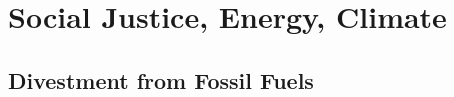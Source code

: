 \chapter{Social Justice, Energy, Climate}\label{ch:climate_justice}

\section{Divestment from Fossil Fuels}

